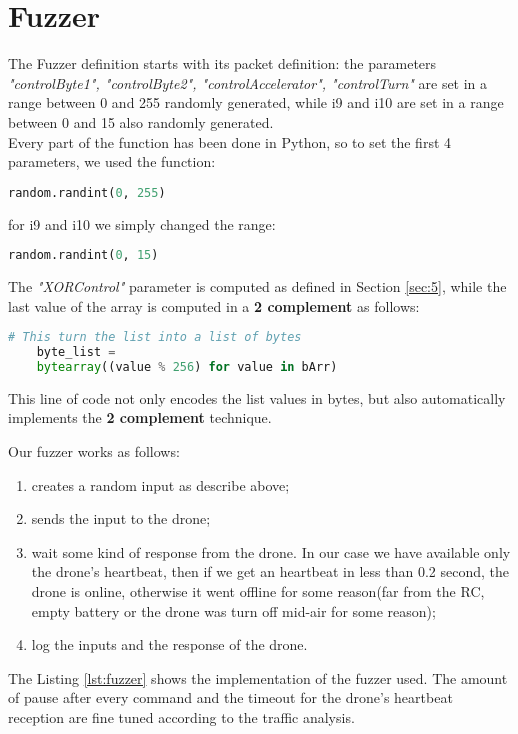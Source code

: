 \section{Fuzzer}
The Fuzzer definition starts with its packet definition: the parameters \textit{"controlByte1", "controlByte2", "controlAccelerator", "controlTurn"} are set in a range between 0 and 255 randomly generated, while i9 and i10 are set in a range between 0 and 15 also randomly generated.\\
Every part of the function has been done in Python, so to set the first 4 parameters, we used the function:
\begin{lstlisting}[language=Python, basicstyle=\small, caption=Parameters generation]
    random.randint(0, 255)
\end{lstlisting}
for i9 and i10 we simply changed the range:
\begin{lstlisting}[language=Python, basicstyle=\small, caption=Parameters generation]
    random.randint(0, 15)
\end{lstlisting}
The \textit{"XORControl"} parameter is computed as defined in Section \ref{sec:5}, while the last value of the array is computed in a \textbf{2 complement} as follows:
\begin{lstlisting}[language=Python, basicstyle=\small, caption=Parameters generation]
    # This turn the list into a list of bytes
    byte_list = 
    bytearray((value % 256) for value in bArr)
\end{lstlisting}
This line of code not only encodes the list values in bytes, but also automatically implements the \textbf{2 complement} technique.

Our fuzzer works as follows:
\begin{enumerate}
    \item creates a random input as describe above;
    \item sends the input to the drone;
    \item wait some kind of response from the drone. In our case we have available only the drone's heartbeat, then if we get an heartbeat in less than 0.2 second, the drone is online, otherwise it went offline for some reason(far from the RC, empty battery or the drone was turn off mid-air for some reason);
    \item log the inputs and the response of the drone.
\end{enumerate}
The Listing \ref{lst:fuzzer} shows the implementation of the fuzzer used.
The amount of pause after every command and the timeout for the drone's heartbeat reception are fine tuned according to the traffic analysis.

